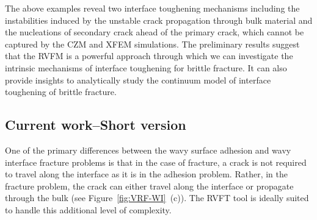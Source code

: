 \documentclass[10pt,letterpaper]{article}
\begin{document}
The above examples reveal two interface toughening mechanisms including the instabilities induced by the unstable crack propagation through bulk material and the nucleations of secondary crack ahead of the primary crack, which cannot be captured by the CZM and XFEM simulations. The preliminary results suggest that the RVFM is a powerful approach through which we can investigate the intrinsic mechanisms of interface toughening for brittle fracture. It can also provide insights to analytically study the continuum model of interface toughening of brittle fracture.


\subsection{Current work--Short version}
 One of the primary differences between the wavy surface adhesion and wavy interface fracture problems is that in the case of fracture, a crack is not required to travel along the interface as it is in the adhesion problem. 
 Rather, in the fracture problem, the crack can either travel along the interface or propagate through the bulk (see Figure~\ref{fig:VRF-WI}~(c)). The RVFT tool is ideally suited to handle this additional level of complexity.



\end{document}
